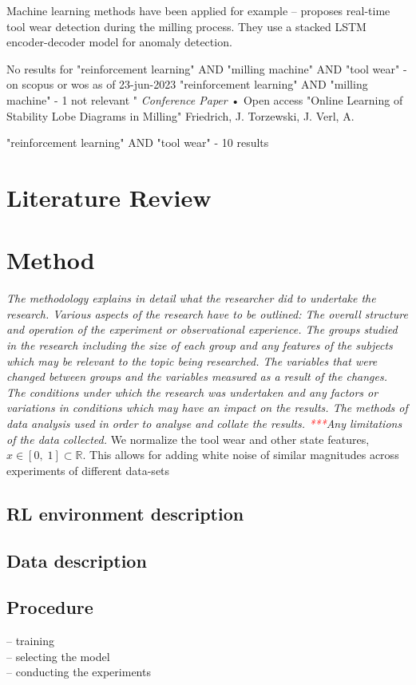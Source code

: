 \documentclass[a4paper, 12pt]{article}
\begin{document}
Machine learning methods have been applied for example --
\cite{oshida2023development} proposes real-time tool wear detection during the milling process. They use a stacked LSTM encoder-decoder model for anomaly detection.


No results for "reinforcement learning" AND "milling machine" AND "tool wear" - on scopus or wos as of 23-jun-2023
"reinforcement learning" AND "milling machine" - 1 not relevant "	
\textit{Conference Paper}  •  Open access "Online Learning of Stability Lobe Diagrams in Milling" 	
Friedrich, J. Torzewski, J.  Verl, A.

"reinforcement learning" AND "tool wear" - 10 results


\section{Literature Review}

\section{Method}

\textit{The methodology explains in detail what the researcher did to undertake the research. Various aspects of the research have to be outlined: The overall structure and operation of the experiment or observational experience. The groups studied in the research including the size of each group and any features of the subjects which may be relevant to the topic being researched. The variables that were changed between groups and the variables measured as a result of the changes. The conditions under which the research was undertaken and any factors or variations in conditions which may have an impact on the results. The methods of data analysis used in order to analyse and collate the results. \textcolor{red}{***}Any limitations of the data collected.}
We normalize the tool wear and other state features, $x \in [0,\;1] \subset \mathbb{R} $. This allows for adding white noise of similar magnitudes across experiments of different data-sets
\subsection{RL environment description}
\subsection{Data description}
\subsection{Procedure}
 -- training \\
 -- selecting the model\\
 -- conducting the experiments\\
 
\end{document}
